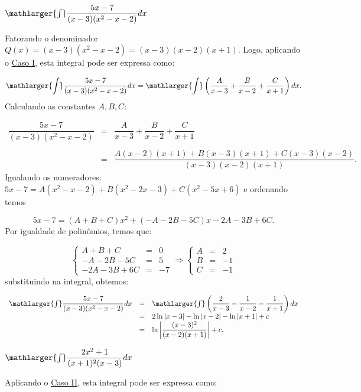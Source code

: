 \cleardoublepage\documentclass[../main.tex]{subfiles}
\begin{document}
\begin{exeresol}
\begin{compactenum}[a)]
\begin{solution}
\end{solution}
\item \(\mathlarger{\int}\dfrac{5x-7}{(x-3)(x^2-x-2)} dx\)\\

\begin{solution}
Fatorando o denominador \(Q(x)=(x-3)(x^2-x-2)= (x-3)(x-2)(x+1)\). Logo, aplicando o \hyperlink{FracParcCasoI}{Caso I}, esta integral pode ser expressa como:

\[ \mathlarger{\int}\dfrac{5x-7}{(x-3)(x^2-x-2)} dx =\mathlarger{\int}\left(\dfrac{A}{x-3}+ \dfrac{B}{x-2}+ \dfrac{C}{x+1} \right) dx. \]
Calculando as constantes \(A,B,C\):

\[ \begin{array}{rcl} \dfrac{5x-7}{(x-3)(x^2-x-2)}&=& \dfrac{A}{x-3}+ \dfrac{B}{x-2}+ \dfrac{C}{x+1} \\ \\ &=& \dfrac{A(x-2)(x+1)+B(x-3)(x+1)+C(x-3)(x-2)}{(x-3)(x-2)(x+1)}. \end{array} \]
Igualando os numeradores: \(5x-7 = A(x^2-x-2)+B(x^2-2x-3)+C(x^2-5x+6)\) e ordenando temos

\[ 5x-7=(A+B+C)x^2 +(-A-2B-5C)x -2A-3B+6C. \]
Por igualdade de polinômios, temos que:

\[ \left\{ \begin{array}{rcr} A+B+C &=&0\\ -A-2B-5C &=&5\\ -2A-3B+6C&=&-7 \end{array} \right. \Rightarrow \left\{ \begin{array}{ccr} A&=&2\\ B&=&-1\\ C&=&-1 \end{array} \right. \]
substituindo na integral, obtemos:

\[ \begin{array}{rcl} \mathlarger{\int}\dfrac{5x-7}{(x-3)(x^2-x-2)} dx &=&\mathlarger{\int}\left(\dfrac{2}{x-3}- \dfrac{1}{x-2} - \dfrac{1}{x+1}\right) dx\\ &=& 2\ln|x-3|-\ln|x-2|-\ln|x+1|+c\\ &=& \ln\left|\dfrac{(x-3)^2}{(x-2)(x+1)} \right|+c. \end{array} \]

\end{solution}
\item \(\mathlarger{\int}\dfrac{2x^2+1}{(x+1)^2(x-3)} dx\)\\

\begin{solution}
Aplicando o \hyperlink{FracParcCasoII}{Caso II}, esta integral pode ser expressa como:


\end{solution}
\end{compactenum}
\end{exeresol}
\end{document}
